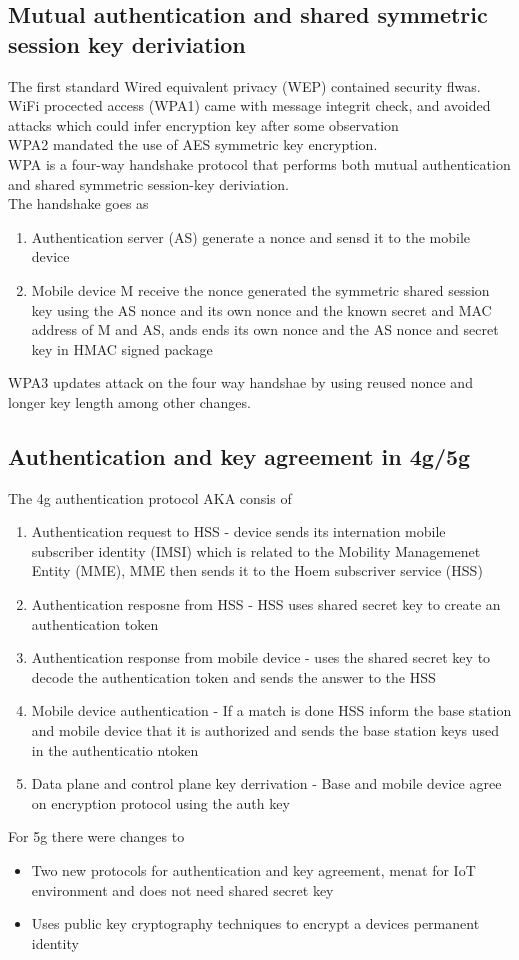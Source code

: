 \documentclass[12pt, a4paper]{article}
\begin{document}
		\subsection{Mutual authentication and shared symmetric session key deriviation}
			The first standard Wired equivalent privacy (WEP) contained security flwas.\\
			WiFi procected access (WPA1) came with message integrit check, and avoided attacks which could infer encryption key after some observation\\
			WPA2 mandated the use of AES symmetric key encryption.\\
			WPA is a four-way handshake protocol that performs both mutual authentication and shared symmetric session-key deriviation.\\
			The handshake goes as
			\begin{enumerate}
				\item Authentication server (AS) generate a nonce and sensd it to the mobile device
				\item Mobile device M receive the nonce generated the symmetric shared session key using the AS nonce and its own nonce and the known secret and MAC address of M and AS, ands ends its own nonce and the AS nonce and secret key in HMAC signed package
			\end{enumerate}
			WPA3 updates attack on the four way handshae by using reused nonce and longer key length among other changes.\\
		\subsection{Authentication and key agreement in 4g/5g}
			The 4g authentication protocol AKA consis of 
			\begin{enumerate}
				\item Authentication request to HSS - device sends its internation mobile subscriber identity (IMSI) which is related to the Mobility Managemenet Entity (MME), MME then sends it to the Hoem subscriver service (HSS)
				\item Authentication resposne from HSS - HSS uses shared secret key to create an authentication token
				\item Authentication response from mobile device - uses the shared secret key to decode the authentication token and sends the answer to the HSS
				\item Mobile device authentication - If a match is done HSS inform the base station and mobile device that it is authorized and sends the base station keys used in the authenticatio ntoken
				\item Data plane and control plane key derrivation - Base and mobile device agree on encryption protocol using the auth key
			\end{enumerate}
			For 5g there were changes to
			\begin{itemize}
				\item Two new protocols for authentication and key agreement, menat for IoT environment and does not need shared secret key
				\item Uses public key cryptography techniques to encrypt a devices permanent identity
			\end{itemize}
\end{document}
